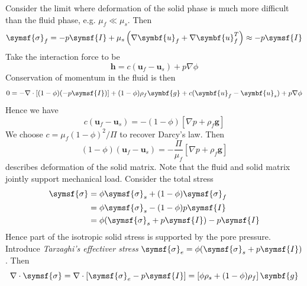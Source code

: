 \documentclass{jknotes}
\renewcommand{\u}{\symbf{u}}
\begin{document}
Consider the limit where deformation of the solid phase is much more difficult
than the fluid phase, e.g. $\mu_f \ll \mu_s$. Then
\begin{equation}
	\symsf{\sigma}_f = -p\symsf{I} + \mu_s \left(\nabla \u_f + \nabla
	\u_f^T\right) \approx -p\symsf{I}
\end{equation}
Take the interaction force to be
\begin{equation}
	\symbf{h} = c(\u_f - \u_s)+p\nabla \phi
\end{equation}
Conservation of momentum in the fluid is then
\begin{equation}
	0 = -\nabla \cdot \left[ (1-\phi)(-p\symsf{I})\right] + (1-\phi) \rho_f
	\symbf{g} + c(\u_f - \u_s) + p\nabla \phi
\end{equation}
Hence we have
\begin{equation}
	c(\u_f - \u_s) = -(1-\phi)\left[\nabla p + \rho_f \symbf{g}\right]
\end{equation}
We choose $c = \mu_f(1-\phi)^2/\Pi$ to recover Darcy's law. Then
\begin{equation}
	(1-\phi) (\u_f - \u_s) = -\frac{\Pi}{\mu_f}\left[\nabla p + \rho_f
	\symbf{g}\right]
	\label{eq:darcy}
\end{equation}
describes deformation of the solid matrix. Note that the fluid and solid
matrix jointly support mechanical load. Consider the total stress
\begin{align}
	\symsf{\sigma} &= \phi \symsf{\sigma}_s + (1-\phi)\symsf{\sigma}_f \\
				   &= \phi \symsf{\sigma}_s - (1-\phi)p \symsf{I} \\
				   &= \phi(\symsf{\sigma}_s + p\symsf{I}) - p \symsf{I}
\end{align}
Hence part of the isotropic solid stress is supported by the pore pressure.
Introduce \emph{Tarzaghi's effectiver stress} $\symsf{\sigma}_e =
\phi(\symsf{\sigma}_s + p\symsf{I})$.  Then
\begin{equation}
	\nabla \cdot \symsf{\sigma} = \nabla \cdot \left[\symsf{\sigma}_e
	-p\symsf{I}\right] = \left[\phi \rho_s + (1-\phi)\rho_f\right] \symbf{g}
\end{equation}
\end{document}
